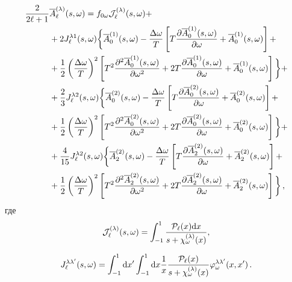 \documentclass[14pt, russian]{article}
\newcommand{\dd}{\mathrm{d}} %
\begin{document}
\begin{equation}\label{eq:SysAPart}
\begin{aligned}		
\frac{2}{2 \ell +1} &\overline{A}_\ell^{(\lambda)}(s,\omega)= f_{0\omega} {\cal J}_\ell^{(\lambda)}(s,\omega) +
\\
&+2J_\ell^{\lambda 1}(s,\omega)\bigg\{ \overline{A}_{0}^{(1)}(s,\omega) - \frac{\Delta\omega}{T} 
\left[
T \frac{\partial \overline{A}_{0}^{(1)}(s,\omega)}{\partial \omega} + \overline{A}_{0}^{(1)}(s,\omega)
\right]+
\\
&+ \frac{1}{2}\left(\frac{\Delta\omega}{T}\right)^2 
\left[
T^2 \frac{\partial^2 \overline{A}_{0}^{(1)}(s,\omega)}{\partial \omega^2} + 2T \frac{\partial \overline{A}_{0}^{(1)}(s,\omega)}{\partial \omega}+\overline{A}_{0}^{(1)}(s,\omega)
\right]\bigg\}+
\\
&+\frac{2}{3} J_\ell^{\lambda 2}(s,\omega)\bigg\{\overline{A}_{0}^{(2)}(s,\omega) - \frac{\Delta\omega}{T} 
\left[
T \frac{\partial \overline{A}_{0}^{(2)}(s,\omega)}{\partial \omega} + \overline{A}_{0}^{(2)}(s,\omega)
\right]+
\\
&+ \frac{1}{2}\left(\frac{\Delta\omega}{T}\right)^2 
\left[
T^2 \frac{\partial^2 \overline{A}_{0}^{(2)}(s,\omega)}{\partial \omega^2} + 2T \frac{\partial \overline{A}_{0}^{(2)}(s,\omega)}{\partial \omega}+\overline{A}_{0}^{(2)}(s,\omega)
\right]\bigg\}+
\\
&+\frac{4}{15}J_\ell^{\lambda 2}(s,\omega)\bigg\{\overline{A}_{2}^{(2)}(s,\omega) - \frac{\Delta\omega}{T} 
\left[
T \frac{\partial \overline{A}_{2}^{(2)}(s,\omega)}{\partial \omega} + \overline{A}_{2}^{(2)}(s,\omega)
\right]+
\\
&+ \frac{1}{2}\left(\frac{\Delta\omega}{T}\right)^2 
\left[
T^2 \frac{\partial^2 \overline{A}_{2}^{(2)}(s,\omega)}{\partial \omega^2} + 2T \frac{\partial \overline{A}_{2}^{(2)}(s,\omega)}{\partial \omega}+\overline{A}_{2}^{(2)}(s,\omega)
\right]\bigg\}\, ,
\end{aligned}
\end{equation}
где 
\begin{equation}\label{eq:J01}
{\cal J}_\ell^{(\lambda)}(s,\omega)=\int_{-1}^{1} \frac{{\cal P}_\ell(x)\dd x}{s+{\cal \chi}^{(\lambda)}_\omega(x)},
\end{equation}

\begin{equation}\label{eq:Jll}
J_\ell^{\lambda\lambda'}(s,\omega) =\int_{-1}^{1}\dd x'\int_{-1}^{1}\dd x \frac{1}{x} \frac{{\cal P}_\ell(x)}{s+\chi_\omega^{(\lambda)}(x)} \varphi^{\lambda \lambda '}_\omega(x,x')\, .
\end{equation}
\end{document}
